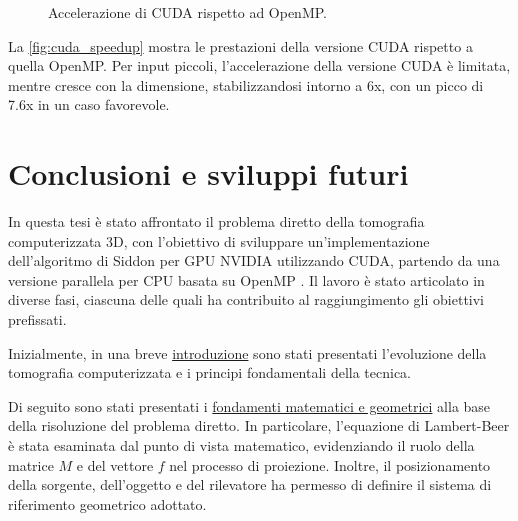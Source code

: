 \documentclass[12pt,a4paper]{report}
\begin{document}
\begin{figure}[H]
  \centering
    \caption{\label{fig:cuda_speedup} Accelerazione di CUDA rispetto ad OpenMP.}
\end{figure}

La \autoref{fig:cuda_speedup} mostra le prestazioni della versione CUDA rispetto a quella OpenMP.
Per input piccoli, l'accelerazione della versione CUDA è limitata, mentre cresce con la dimensione, stabilizzandosi intorno a 6x,
con un picco di 7.6x in un caso favorevole.

\appendix

\chapter{Conclusioni e sviluppi futuri}

In questa tesi è stato affrontato il problema diretto della tomografia computerizzata 3D, con l'obiettivo di sviluppare
un'implementazione dell'algoritmo di Siddon \cite{Siddon1984} per GPU NVIDIA utilizzando CUDA, partendo da una versione parallela
per CPU basata su OpenMP \cite{Colletta2024}.
Il lavoro è stato articolato in diverse fasi, ciascuna delle quali ha contribuito al raggiungimento gli obiettivi prefissati.

Inizialmente, in una breve \hyperref[chap:intro]{introduzione} sono stati presentati l'evoluzione della tomografia computerizzata
e i principi fondamentali della tecnica.

Di seguito sono stati presentati i \hyperref[chap:math]{fondamenti matematici e geometrici} alla base della risoluzione del
problema diretto.
In particolare, l'equazione di Lambert-Beer è stata esaminata dal punto di vista matematico, evidenziando il ruolo della matrice
\(M\) e del vettore \(f\) nel processo di proiezione.
Inoltre, il posizionamento della sorgente, dell'oggetto e del rilevatore ha permesso di definire il sistema di riferimento
geometrico adottato.
\end{document}
